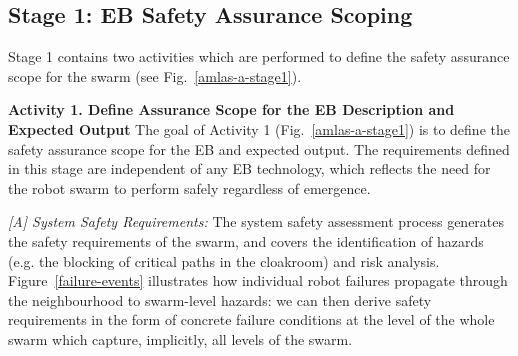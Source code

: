 \documentclass[runningheads]{llncs}
\begin{document}
%

\subsection{Stage 1: EB Safety Assurance Scoping} \label{framework-stage1}
Stage 1 contains two activities which are performed to define the safety assurance scope for the swarm (see Fig.~\ref{amlas-a-stage1}). 

\noindent\textbf{Activity 1. Define Assurance Scope for the EB Description and Expected Output}
The goal of Activity 1 (Fig.~\ref{amlas-a-stage1}) is to define the safety assurance scope for the EB and expected output. 
The requirements defined in this stage are independent of any EB technology, which reflects the need for the robot swarm to perform safely regardless of emergence. 

\emph{[A] System Safety Requirements:}
The system safety assessment process generates the safety requirements of the swarm, and covers the identification of hazards (e.g. the blocking of critical paths in the cloakroom) and risk analysis.
Figure~\ref{failure-events} illustrates how individual robot failures propagate through the neighbourhood to swarm-level hazards: we can then derive safety requirements in the form of concrete failure conditions at the level of the whole swarm which capture, implicitly, all levels of the swarm. 
\end{document}
